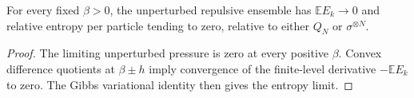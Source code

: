 \begin{corollary}
For every fixed $\beta>0$, the unperturbed repulsive ensemble has
$\mathbb E E_k\to0$ and relative entropy per particle tending to
zero, relative to either $Q_N$ or $\sigma^{\otimes N}$.
\end{corollary}
\begin{proof}
The limiting unperturbed pressure is zero at every positive $\beta$.
Convex difference quotients at $\beta\pm h$ imply convergence of
the finite-level derivative $-\mathbb E E_k$ to zero.
The Gibbs variational identity then gives the entropy limit.
\end{proof}
